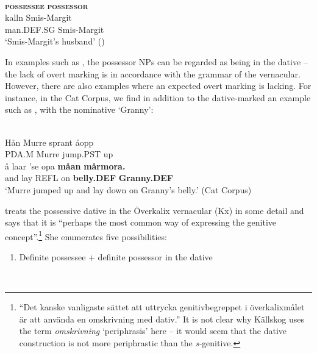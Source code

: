 \ea\label{}
	\\
	\glll \textbf{\textsc{possessee}} \textbf{\textsc{possessor}} \\
	kalln  Smis-Margit \\
	man.DEF.SG  Smis-Margit\\
\glt ‘Smis-Margit’s husband’ (\citet[97]{Levander1909})
\z

In examples such as , the possessor NPs can be regarded as being in the dative – the lack of overt marking is in accordance with the grammar of the vernacular. However, there are also examples where an expected overt marking is lacking. For instance, in the Cat Corpus, we find in addition to the dative-marked  an example such as , with the nominative  ‘Granny’: 

\renewcommand{\eachwordone}{\itshape}


\ea\label{}
\\
\gll Hån  Murre  sprant  åopp\\
PDA.M  Murre  jump.PST  up\\
\gll å  laar  ’se  opa  \textbf{måan} \textbf{mårmora.}\\
and  lay  REFL  on  \textbf{belly.DEF} \textbf{Granny.DEF}\\
\glt ‘Murre jumped up and lay down on Granny’s belly.’ (Cat Corpus)
\z

\citet[161--163]{Källskog1992} treats the possessive dative in the Överkalix vernacular (Kx) in some detail and says that it is “perhaps the most common way of expressing the genitive concept”.\footnote{ “Det kanske vanligaste sättet att uttrycka genitivbegreppet i överkalixmålet är att använda en omskrivning med dativ.” It is not clear why Källskog uses the term \textit{omskrivning} ‘periphrasis’ here – it would seem that the dative construction is not more periphrastic than the \textit{s-}genitive.} She enumerates five possibilities:

\renewcommand{\eachwordone}{\scshape}

\begin{enumerate}
\item[1] Definite possessee + definite possessor in the dative
\end{enumerate}


\ea\label{}
\\

